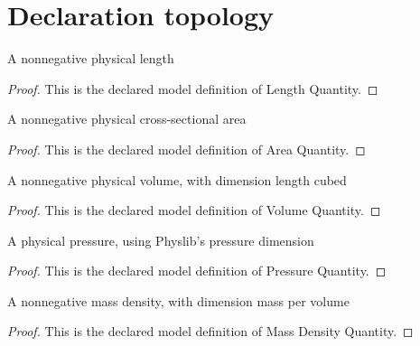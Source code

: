 \section{Declaration topology}
\begin{definition}
  \label{def:physics:phyx-mini-0366:phyxminiproblems-problemphyxmini0366-lengthquantity}
  A nonnegative physical length
\end{definition}
\begin{proof}
  This is the declared model definition of Length Quantity.
\end{proof}
\begin{definition}
  \label{def:physics:phyx-mini-0366:phyxminiproblems-problemphyxmini0366-areaquantity}
  A nonnegative physical cross-sectional area
\end{definition}
\begin{proof}
  This is the declared model definition of Area Quantity.
\end{proof}
\begin{definition}
  \label{def:physics:phyx-mini-0366:phyxminiproblems-problemphyxmini0366-volumequantity}
  A nonnegative physical volume, with dimension length cubed
\end{definition}
\begin{proof}
  This is the declared model definition of Volume Quantity.
\end{proof}
\begin{definition}
  \label{def:physics:phyx-mini-0366:phyxminiproblems-problemphyxmini0366-pressurequantity}
  A physical pressure, using Physlib's pressure dimension
\end{definition}
\begin{proof}
  This is the declared model definition of Pressure Quantity.
\end{proof}
\begin{definition}
  \label{def:physics:phyx-mini-0366:phyxminiproblems-problemphyxmini0366-massdensityquantity}
  A nonnegative mass density, with dimension mass per volume
\end{definition}
\begin{proof}
  This is the declared model definition of Mass Density Quantity.
\end{proof}
